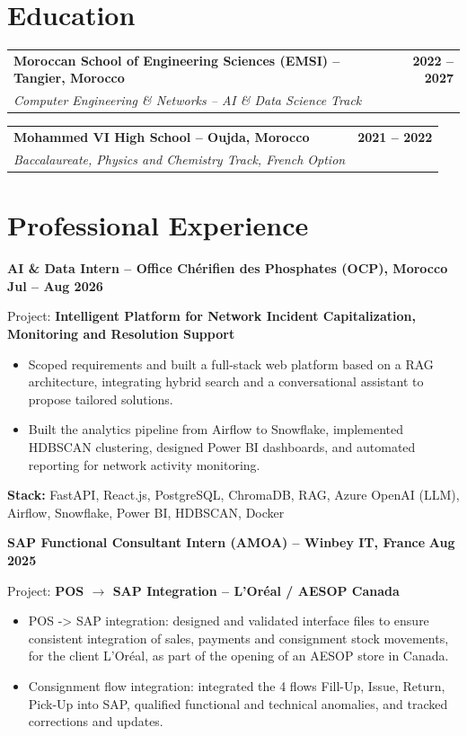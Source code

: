 \documentclass[a4paper,10pt]{article}
\makeatletter
\newcommand{\eduentry}[3]{%
  \noindent
  \begin{tabularx}{\linewidth}{@{}X r@{}}
    {\bfseries #1} & {\bfseries #3}\\[-0.5pt]
    {\itshape #2} &
  \end{tabularx}
  \vspace{-0.1pt}
}
\makeatother
\begin{document}
\section{Education}

\eduentry
{Moroccan School of Engineering Sciences (EMSI) -- Tangier, Morocco}
{Computer Engineering \& Networks -- AI \& Data Science Track}
{2022 -- 2027}

\eduentry
{Mohammed VI High School -- Oujda, Morocco}
{Baccalaureate, Physics and Chemistry Track, French Option}
{2021 -- 2022}

\section{Professional Experience}
\textbf{AI \& Data Intern --  Office Chérifien des Phosphates (OCP), Morocco }
\hfill
\textbf{Jul -- Aug 2026}\par
\vspace{3pt}
Project:
\textbf{Intelligent Platform for Network Incident Capitalization, Monitoring and Resolution Support }\par

\begin{itemize}[label=\textbullet]

\item Scoped requirements and built a full-stack web platform based on a RAG architecture, integrating hybrid search and a conversational assistant to propose tailored solutions.
\item Built the analytics pipeline from Airflow to Snowflake, implemented HDBSCAN clustering, designed Power BI dashboards, and automated reporting for network activity monitoring.

\end{itemize}

\textbf{Stack:}
FastAPI, React.js, PostgreSQL, ChromaDB, RAG,
Azure OpenAI (LLM), Airflow, Snowflake,
Power BI, HDBSCAN, Docker

\vspace{2.8pt}
\textbf{SAP Functional Consultant Intern (AMOA) -- Winbey IT, France}
\textbf{}
\hfill
\textbf{Aug 2025}\par
\vspace{3pt}
Project:\textbf{ POS \(\rightarrow\) SAP Integration -- L'Oréal / AESOP Canada}
\begin{itemize}[label=\textbullet]
\item POS -> SAP integration: designed and validated interface files to ensure consistent integration of sales,
payments and consignment stock movements, for the client
L'Oréal, as part of the opening of an AESOP store
in Canada.

\item
Consignment flow integration: integrated the 4 flows
Fill-Up, Issue, Return, Pick-Up into SAP, qualified functional and technical
anomalies, and tracked corrections and updates.
\end{itemize}
\end{document}
